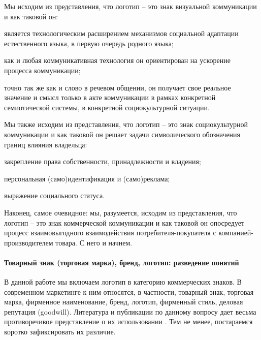 Мы исходим из представления, что логотип -- это знак визуальной коммуникации и
как таковой он:
\begin{enumerate*}
\item является технологическим расширением механизмов социальной адаптации
  естественного языка, в первую очередь родного языка;
\item как и любая коммуникативная технология он ориентирован на ускорение
  процесса коммуникации;
\item точно так же как и слово в речевом общении, он получает свое реальное
  значение и смысл только в акте коммуникации в рамках конкретной
  семиотической системы, в конкретной социокультурной ситуации.
\end{enumerate*}

Мы также исходим из представления, что логотип -- это знак социокультурной
коммуникации и как таковой он решает задачи символического обозначения границ
влияния владельца:
\begin{enumerate*}[label=\asbuk*)]
\item закрепление права собственности, принадлежности и владения;
\item персональная (само)идентификация и (само)реклама;
\item выражение социального статуса.
\end{enumerate*}

Наконец, самое очевидное: мы, разумеется, исходим из представления, что логотип --
это знак коммерческой коммуникации и как таковой он опосредует процесс взаимовыгодного
взаимодействия потребителя-покупателя с компанией-производителем товара. С него и начнем.

\paragraph{Товарный знак (торговая марка), бренд, логотип: разведение понятий}


В данной работе мы включаем логотип в категорию коммерческих знаков. В современном
маркетинге к ним относятся, в частности, товарный знак, торговая марка,
фирменное наименование, бренд, логотип, фирменный стиль, деловая репутация (goodwill).
Литература и публикации по данному вопросу дает весьма противоречивое
представление о их использовании \autocite{clifton2009}\autocite{eiri2011}\autocite{designing2009}\autocite{mollerup1999marks}\autocite{serov2005}\autocite{werkman1986}. Тем не менее, постараемся коротко зафиксировать их различие.

